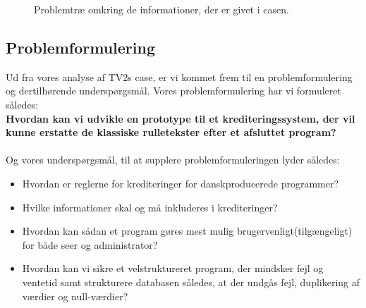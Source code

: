  \begin{figure}[H]
    \centering
    \caption{Problemtræ omkring de informationer, der er givet i casen.}
    \label{fig:problemtræ}
\end{figure}

\subsection{Problemformulering}
Ud fra vores analyse af TV2s case, er vi kommet frem til en problemformulering og dertilhørende underspørgsmål. Vores problemformulering har vi formuleret således:\\
\linebreak
\textbf{Hvordan kan vi udvikle en prototype til et krediteringssystem, der vil kunne erstatte de klassiske rulletekster efter et afsluttet program?}
\\\\
Og vores underspørgsmål, til at supplere problemformuleringen lyder således:
\begin{itemize}
    \item Hvordan er reglerne for krediteringer for danskproducerede programmer?
    \item Hvilke informationer skal og må inkluderes i krediteringer?
    \item Hvordan kan sådan et program gøres mest mulig brugervenligt(tilgængeligt) for både seer og administrator?
    \item Hvordan kan vi sikre et velstruktureret program, der mindsker fejl og ventetid samt strukturere databasen således, at der undgås fejl, duplikering af værdier og null-værdier?
\end{itemize}

